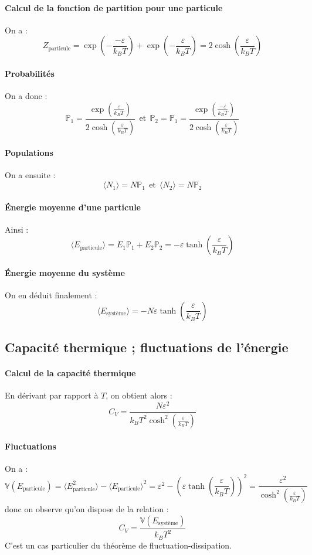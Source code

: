 \documentclass[french]{book}
\theoremstyle{plain}
\theoremstyle{definition}
\theoremstyle{remark}
\renewcommand{\P}{\mathbb{P}}
\begin{document}
\paragraph{Calcul de la fonction de partition pour une particule} On a : $$Z_\text{particule}=\exp\left(-\frac{-\varepsilon}{k_BT}\right)+\exp\left(-\frac{\varepsilon}{k_BT}\right)=2\cosh\left(\frac{\varepsilon}{k_BT}\right)$$

\paragraph{Probabilités} On a donc : $$\P_1=\frac{\exp\left(\frac{\varepsilon}{k_BT}\right)}{2\cosh\left(\frac{\varepsilon}{k_BT}\right)}\ \ \text{et}\ \ \P_2=\P_1=\frac{\exp\left(\frac{-\varepsilon}{k_BT}\right)}{2\cosh\left(\frac{\varepsilon}{k_BT}\right)}$$

\paragraph{Populations} On a ensuite : $$\langle N_1\rangle=N\P_1\ \ \text{et} \ \ \langle N_2\rangle=N\P_2$$

\paragraph{Énergie moyenne d'une particule} Ainsi : $$\langle E_\text{particule}\rangle=E_1\P_1+E_2\P_2=-\varepsilon\tanh\left(\frac{\varepsilon}{k_BT}\right)$$

\paragraph{Énergie moyenne du système} On en déduit finalement : $$\langle E_\text{système}\rangle =-N\varepsilon\tanh\left(\frac{\varepsilon}{k_BT}\right)$$

\subsection{Capacité thermique ; fluctuations de l'énergie}

\paragraph{Calcul de la capacité thermique} En dérivant par rapport à $T$, on obtient alors : $$C_V=\frac{N\varepsilon^2}{k_BT^2\cosh^2\left(\frac{\varepsilon}{k_BT}\right)}$$

\paragraph{Fluctuations} On a : $$\mathbb{V}(E_\text{particule})=\langle E_\text{particule}^2\rangle-\langle E_\text{particule}\rangle^2=\varepsilon^2-\left(\varepsilon\tanh\left(\frac{\varepsilon}{k_BT}\right)\right)^2=\frac{\varepsilon^2}{\cosh^2\left(\frac{\varepsilon}{k_BT}\right)}$$ donc on observe qu'on dispose de la relation : $$C_V=\frac{\mathbb{V}(E_\text{système})}{k_BT^2}$$ C'est un cas particulier du théorème de fluctuation-dissipation.
\end{document}

